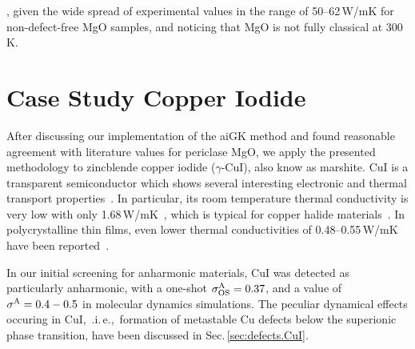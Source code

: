 , given the wide spread of experimental values in the range of 50--62\,W/mK for non-defect-free MgO samples, and noticing that MgO is not fully classical at 300\,K.

\section{Case Study Copper Iodide}


After discussing our implementation of the aiGK method and found reasonable agreement with literature values for periclase MgO, we apply the presented methodology to zincblende copper iodide ($\gamma$-CuI), also know as marshite. CuI is a transparent semiconductor which shows several interesting electronic and thermal transport properties~. In particular, its room temperature thermal conductivity is very low with only 1.68\,W/mK~\cite{perry2016}, which is typical for copper halide materials~. In polycrystalline thin films, even lower thermal conductivities of 0.48--0.55\,W/mK have been reported~\cite{yang2017,coroa2019}.

In our initial screening for anharmonic materials, CuI was detected as particularly anharmonic, with a one-shot $\sigma^\mathrm{A}_\mathrm{OS} = 0.37$, and a value of $\sigma^\mathrm{A} = 0.4-0.5$ in molecular dynamics simulations. The peculiar dynamical effects occuring in CuI,~.i.\,e.,~formation of metastable Cu defects below the superionic phase transition, have been discussed in Sec.\,\ref{sec:defects.CuI}.


